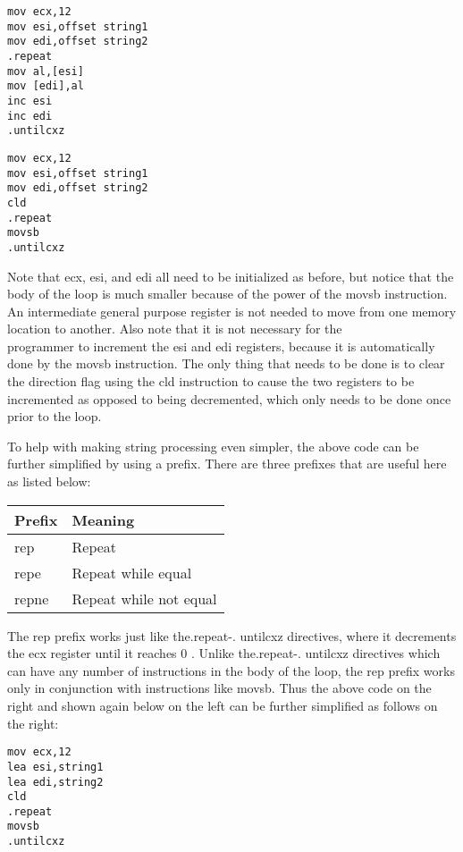 \documentclass[10pt]{article}
\begin{document}
\begin{verbatim}
mov ecx,12
mov esi,offset string1
mov edi,offset string2
.repeat
mov al,[esi]
mov [edi],al
inc esi
inc edi
.untilcxz
\end{verbatim}

\begin{verbatim}
mov ecx,12
mov esi,offset string1
mov edi,offset string2
cld
.repeat
movsb
.untilcxz
\end{verbatim}

Note that ecx, esi, and edi all need to be initialized as before, but notice that the body of the loop is much smaller because of the power of the movsb instruction. An intermediate general purpose register is not needed to move from one memory location to another. Also note that it is not necessary for the\\
programmer to increment the esi and edi registers, because it is automatically done by the movsb instruction. The only thing that needs to be done is to clear the direction flag using the cld instruction to cause the two registers to be incremented as opposed to being decremented, which only needs to be done once prior to the loop.

To help with making string processing even simpler, the above code can be further simplified by using a prefix. There are three prefixes that are useful here as listed below:

\begin{center}
\begin{tabular}{|l|l|}
\hline
Prefix & Meaning \\
\hline
rep & Repeat \\
\hline
repe & Repeat while equal \\
\hline
repne & Repeat while not equal \\
\hline
\end{tabular}
\end{center}

The rep prefix works just like the.repeat-. untilcxz directives, where it decrements the ecx register until it reaches 0 . Unlike the.repeat-. untilcxz directives which can have any number of instructions in the body of the loop, the rep prefix works only in conjunction with instructions like movsb. Thus the above code on the right and shown again below on the left can be further simplified as follows on the right:

\begin{verbatim}
mov ecx,12
lea esi,string1
lea edi,string2
cld
.repeat
movsb
.untilcxz
\end{verbatim}
\end{document}
